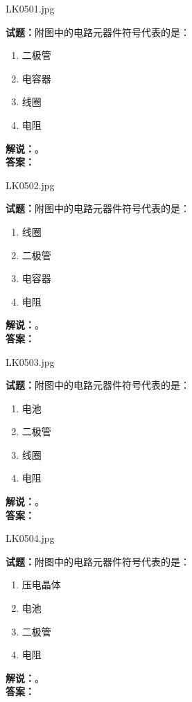\documentclass{ctexbook}
\begin{document}
\bigskip

LK0501.jpg


\noindent\textbf{试题：}附图中的电路元器件符号代表的是：
\begin{enumerate}[leftmargin=3em]
\item 二极管
\item 电容器
\item 线圈
\item 电阻
\end{enumerate}
\noindent\textbf{解说：}\textbf{}。\\\noindent\textbf{答案：}

\bigskip

LK0502.jpg


\noindent\textbf{试题：}附图中的电路元器件符号代表的是：
\begin{enumerate}[leftmargin=3em]
\item 线圈
\item 二极管
\item 电容器
\item 电阻
\end{enumerate}
\noindent\textbf{解说：}\textbf{}。\\\noindent\textbf{答案：}

\bigskip

LK0503.jpg


\noindent\textbf{试题：}附图中的电路元器件符号代表的是：
\begin{enumerate}[leftmargin=3em]
\item 电池
\item 二极管
\item 线圈
\item 电阻
\end{enumerate}
\noindent\textbf{解说：}\textbf{}。\\\noindent\textbf{答案：}

\bigskip

LK0504.jpg


\noindent\textbf{试题：}附图中的电路元器件符号代表的是：
\begin{enumerate}[leftmargin=3em]
\item 压电晶体
\item 电池
\item 二极管
\item 电阻
\end{enumerate}
\noindent\textbf{解说：}\textbf{}。\\\noindent\textbf{答案：}

\bigskip
\end{document}
